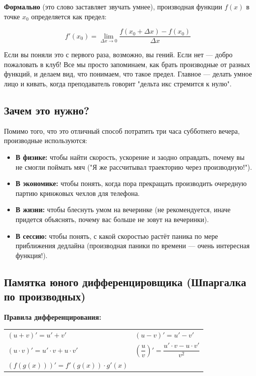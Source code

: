 \documentclass[a4paper,12pt]{article}
\begin{document}
\textbf{Формально} (это слово заставляет звучать умнее), производная функции $f(x)$ в точке $x_0$ определяется как предел:

\[
f'(x_0) = \lim_{\Delta x \to 0} \frac{f(x_0 + \Delta x) - f(x_0)}{\Delta x}
\]

Если вы поняли это с первого раза, возможно, вы гений. Если нет — добро пожаловать в клуб! Все мы просто запоминаем, как брать производные от разных функций, и делаем вид, что понимаем, что такое предел. Главное — делать умное лицо и кивать, когда преподаватель говорит "дельта икс стремится к нулю".

\subsection*{Зачем это нужно?}

Помимо того, что это отличный способ потратить три часа субботнего вечера, производные используются:
\begin{itemize}
    \item \textbf{В физике:} чтобы найти скорость, ускорение и заодно оправдать, почему вы не смогли поймать мяч ("Я же рассчитывал траекторию через производную!").
    \item \textbf{В экономике:} чтобы понять, когда пора прекращать производить очередную партию кринжовых чехлов для телефона.
    \item \textbf{В жизни:} чтобы блеснуть умом на вечеринке (не рекомендуется, иначе придется объяснять, почему вас больше не зовут на вечеринки).
    \item \textbf{В сессию:} чтобы понять, с какой скоростью растёт паника по мере приближения дедлайна (производная паники по времени — очень интересная функция!).
\end{itemize}

\subsection*{Памятка юного дифференцировщика (Шпаргалка по производных)}

\textbf{Правила дифференцирования:}

\begin{tabular}{p{}p{}}
    $(u + v)' = u' + v'$ & $(u - v)' = u' - v'$ \\
    $(u \cdot v)' = u' \cdot v + u \cdot v'$ & $\left(\dfrac{u}{v}\right)' = \dfrac{u' \cdot v - u \cdot v'}{v^2}$ \\
    $(f(g(x)))' = f'(g(x)) \cdot g'(x)$ & \\
\end{tabular}
\end{document}
